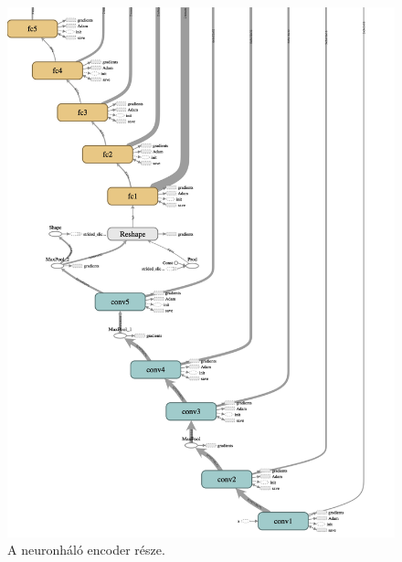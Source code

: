 \begin{figure}[p]
    \includegraphics{src/images/tensorflow_graph_encode.png}
    \caption{A neuronháló encoder része.}
\end{figure}

